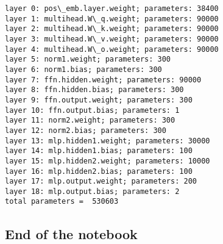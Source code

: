 \documentclass[10pt]{article}
\begin{document}
    \begin{Verbatim}[commandchars=\\\{\}]
layer 0: pos\_emb.layer.weight; parameters: 38400
layer 1: multihead.W\_q.weight; parameters: 90000
layer 2: multihead.W\_k.weight; parameters: 90000
layer 3: multihead.W\_v.weight; parameters: 90000
layer 4: multihead.W\_o.weight; parameters: 90000
layer 5: norm1.weight; parameters: 300
layer 6: norm1.bias; parameters: 300
layer 7: ffn.hidden.weight; parameters: 90000
layer 8: ffn.hidden.bias; parameters: 300
layer 9: ffn.output.weight; parameters: 300
layer 10: ffn.output.bias; parameters: 1
layer 11: norm2.weight; parameters: 300
layer 12: norm2.bias; parameters: 300
layer 13: mlp.hidden1.weight; parameters: 30000
layer 14: mlp.hidden1.bias; parameters: 100
layer 15: mlp.hidden2.weight; parameters: 10000
layer 16: mlp.hidden2.bias; parameters: 100
layer 17: mlp.output.weight; parameters: 200
layer 18: mlp.output.bias; parameters: 2
total parameters =  530603
    \end{Verbatim}

    \hypertarget{end-of-the-notebook}{%
\subsection{End of the notebook}\label{end-of-the-notebook}}


    
    
    
\end{document}
